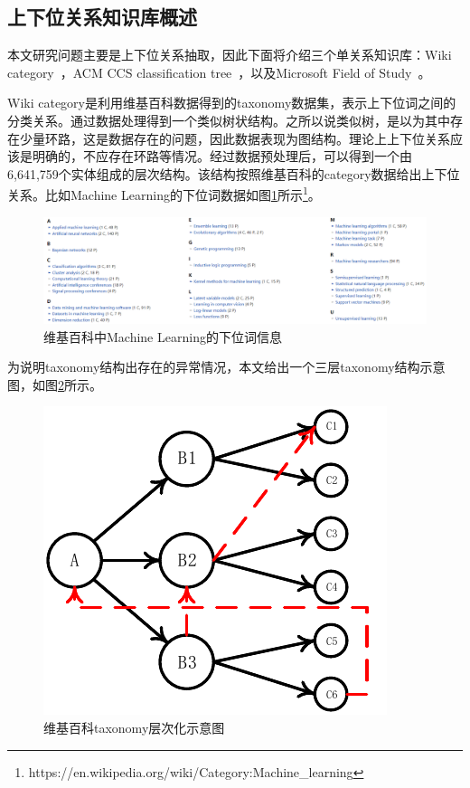 \subsection{上下位关系知识库概述}
本文研究问题主要是上下位关系抽取，因此下面将介绍三个单关系知识库：Wiki category~，ACM CCS classification tree~，以及Microsoft Field of Study~。

Wiki category是利用维基百科数据得到的taxonomy数据集，表示上下位词之间的分类关系。通过数据处理得到一个类似树状结构。之所以说类似树，是以为其中存在少量环路，这是数据存在的问题，因此数据表现为图结构。理论上上下位关系应该是明确的，不应存在环路等情况。经过数据预处理后，可以得到一个由6,641,759个实体组成的层次结构。该结构按照维基百科的category数据给出上下位关系。比如Machine Learning的下位词数据如图\ref{fig:ml_cat}所示\footnote{https://en.wikipedia.org/wiki/Category:Machine\_learning}。
\begin{figure}
	\centering
	\includegraphics[width=.85\linewidth]{./figures/ml_cat.jpg}
	\caption{维基百科中Machine Learning的下位词信息}
	\label{fig:ml_cat}
\end{figure}

为说明taxonomy结构出存在的异常情况，本文给出一个三层taxonomy结构示意图，如图\ref{fig:category}所示。
\begin{figure}
	\centering
	\includegraphics[width=.65\linewidth]{./figures/category.pdf}
	\caption{维基百科taxonomy层次化示意图}
	\label{fig:category}
\end{figure}

